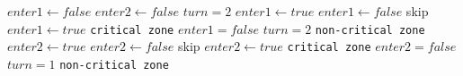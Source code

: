 \documentclass{article}
\begin{document}
\begin{algorithmic}
    \State $ enter1 \gets false $
    \State $ enter2 \gets false $
    \State $ turn = 2$
        \State $ enter1 \gets true $
                 \State $ enter1 \gets false $
                     \State skip
                 \EndWhile
                 \State $ enter1 \gets true $
            \EndIf
        \EndWhile
        \State \texttt{critical zone}
        \State $ enter1 = false $
        \State $ turn = 2 $
        \State \texttt{non-critical zone}
    \EndProcedure
        \State $ enter2 \gets true $
                 \State $ enter2 \gets false $
                     \State skip
                 \EndWhile
                 \State $ enter2 \gets true $
            \EndIf
        \EndWhile
        \State \texttt{critical zone}
        \State $ enter2 = false $
        \State $ turn = 1 $
        \State \texttt{non-critical zone}
    \EndProcedure
\end{algorithmic}
\end{document}
